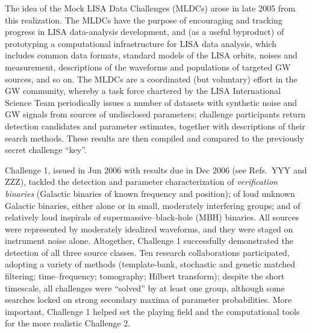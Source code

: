 \documentclass{iopart}
\begin{document}
The idea of the Mock LISA Data Challenges (MLDCs) arose in late 2005 from this realization. The MLDCs have the purpose of encouraging and tracking progress in LISA data-analysis development, and (as a useful byproduct) of prototyping a computational infrastructure for LISA data analysis, which includes common data formats, standard models of the LISA orbits, noises and measurement, descriptions of the waveforms and populations of targeted GW sources, and so on.
The MLDCs are a coordinated (but voluntary) effort in the GW community, whereby a task force chartered by the LISA International Science Team periodically issues a number of datasets with 
synthetic noise and GW signals from sources of undisclosed parameters; challenge participants return detection candidates and parameter estimates, together with descriptions of their search methods. These results are then compiled and compared to the previously secret challenge ``key''.

Challenge 1, issued in Jun 2006 with results due in Dec 2006 (see Refs.\ YYY and ZZZ), tackled the detection and parameter characterization of \emph{verification binaries} (Galactic binaries of known frequency and position); of loud unknown Galactic binaries, either alone or in small, moderately interfering groups; and of relatively loud inspirals of supermassive--black-hole (MBH)  binaries. All sources were represented by moderately idealized waveforms, and they were staged on instrument noise alone. Altogether, Challenge 1 successfully demonstrated the detection of all three source classes. Ten research collaborations participated, adopting a variety of methods (template-bank, stochastic and genetic matched filtering; time--frequency; tomography; Hilbert transform); despite the short timescale, all challenges were ``solved'' by at least one group, although some searches locked on strong secondary maxima of parameter probabilities. More important, Challenge 1 helped set the playing field and the computational tools for the more realistic Challenge 2.
\end{document}
